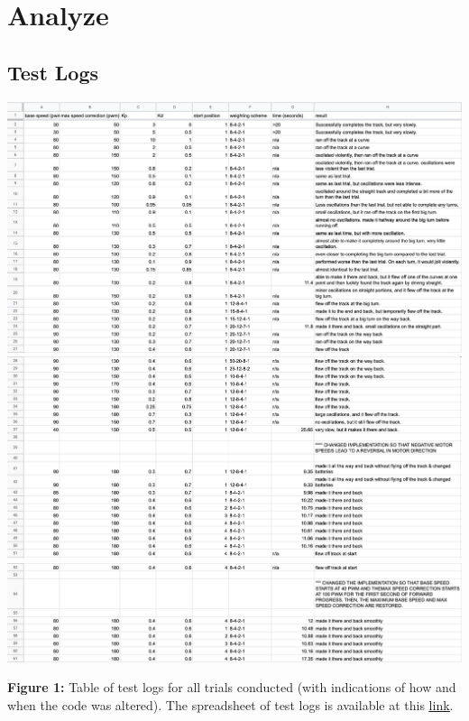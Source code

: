 \documentclass{article}
\begin{document}
\section{Analyze}

\subsection{Test Logs}

\begin{center}
\includegraphics[scale=0.45]{pics/log1.png} \\
\includegraphics[scale=0.45]{pics/log2.png} \\
\includegraphics[scale=0.45]{pics/log3.png}
\end{center}
\noindent \textbf{Figure 1:} Table of test logs for all trials conducted (with indications of how and when the code was altered). The spreadsheet of test logs is available at this \underline{\href{https://docs.google.com/spreadsheets/d/1jPR7GRYgVLwytfdNqy9U_3dGLSMvrA-QAdmIjt_J-6s/edit?usp=sharing}{link}}.
\end{document}
